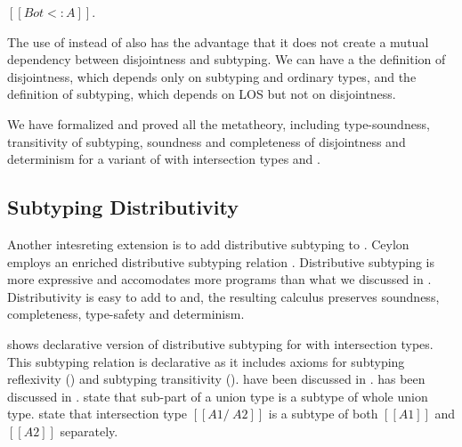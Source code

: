 \begin{lemma}
  $[[Bot <: A]]$.
\label{lemma:discussion:bls}
\end{lemma}

\noindent The use of  instead of  also has the advantage that it does not
create a mutual dependency between disjointness and subtyping. We can have a the definition
of disjointness, which depends only on subtyping and ordinary types, and the definition
of subtyping, which depends on LOS but not on disjointness.

We have formalized and proved all the metatheory, including type-soundness, transitivity of subtyping,
soundness and completeness of disjointness and determinism for a variant of \name with intersection types
and .

\subsection{Subtyping Distributivity}
\label{sec:inter:dist}


Another intesreting extension is to add distributive subtyping to \cal.
Ceylon~\cite{} employs an enriched distributive subtyping relation \cite{}.
Distributive subtyping is more expressive and accomodates more programs than what we discussed in
. Distributivity is easy to add to \cal and, the resulting 
calculus preserves soundness, completeness, type-safety and determinism. 


 shows declarative version of distributive subtyping for \cal with intersection types.
This subtyping relation is declarative as it includes axioms for subtyping reflexivity () and
subtyping transitivity ().  have been
discussed in .  has been discussed in .
 state that sub-part of a union type is a subtype of whole union type.
 state that intersection type $[[A1 /\ A2]]$ is a subtype of both $[[A1]]$
and $[[A2]]$ separately.

